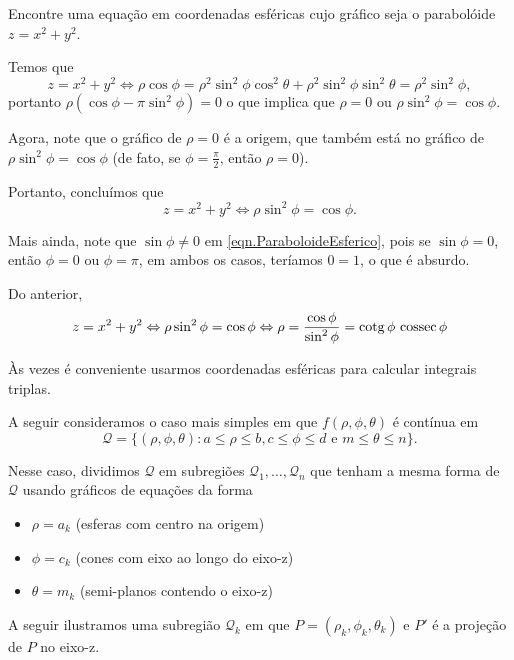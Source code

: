 \begin{example}
    Encontre uma equação em coordenadas esféricas cujo gráfico seja o parabolóide \(z = x^2 + y^2\).

    Temos que \[z = x^2 + y^2 \Leftrightarrow \rho \cos\phi = \rho^2 \sin^2\phi \cos^2\theta + \rho^2 \sin^2\phi \sin^2\theta = \rho^2\sin^2\phi,\] portanto \(\rho(\cos\phi - \pi\sin^2\phi) = 0\) o que implica que \(\rho = 0\) ou \(\rho\sin^2\phi = \cos\phi.\)

    Agora, note que o gráfico de \(\rho = 0\) é a origem, que também está no gráfico de \(\rho\sin^2\phi = \cos\phi\) (de fato, se \(\phi = \frac{\pi}{2}\), então \(\rho = 0\)).

    Portanto, concluímos que
        \begin{equation}\label{eqn.ParaboloideEsferico}
            z = x^2 + y^2 \Leftrightarrow \rho\sin^2\phi = \cos\phi.
        \end{equation}

    Mais ainda, note que \(\sin\phi \neq 0\) em \eqref{eqn.ParaboloideEsferico}, pois se \(\sin\phi = 0\), então \(\phi = 0\) ou \(\phi = \pi\), em ambos os casos, teríamos \(0 = 1\), o que é absurdo.

    Do anterior, \[z = x^2 + y^2 \Leftrightarrow \rho\sin^2\phi = \cos\phi \Leftrightarrow \rho = \frac{\cos\phi}{\sin^2\phi} = \operatorname{cotg}\phi\,\operatorname{cossec}\phi\]
\end{example}

Às vezes é conveniente usarmos coordenadas esféricas para calcular integrais triplas.

A seguir consideramos o caso mais simples em que \(f(\rho,\phi,\theta)\) é contínua em \[\mathcal{Q} = \{(\rho,\phi,\theta) : a\leq\rho\leq b, c\leq\phi\leq d \text{ e } m\leq\theta\leq n\}.\]

Nesse caso, dividimos \(\mathcal{Q}\) em subregiões \(\mathcal{Q}_1,\dots,\mathcal{Q}_n\) que tenham a mesma forma de \(\mathcal{Q}\) usando gráficos de equações da forma
    \begin{itemize}
        \item \(\rho = a_k\) (esferas com centro na origem)
        \item \(\phi = c_k\) (cones com eixo ao longo do eixo-z)
        \item \(\theta = m_k\) (semi-planos contendo o eixo-z)
    \end{itemize}

A seguir ilustramos uma subregião \(\mathcal{Q}_k\) em que \(P = (\rho_k,\phi_k,\theta_k)\) e \(P'\) é a projeção de \(P\) no eixo-z.

